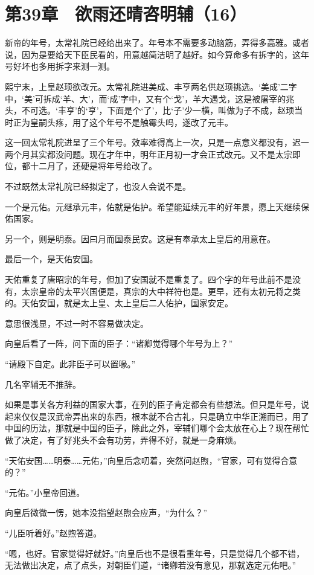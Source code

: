 \section{第39章　欲雨还晴咨明辅（16）}

新帝的年号，太常礼院已经给出来了。年号本不需要多动脑筋，弄得多高雅。或者说，因为是要给天下臣民看的，用意越简洁明了越好。如今算命多有拆字的，这年号好坏也多用拆字来测一测。

熙宁末，上皇赵顼欲改元。太常礼院进美成、丰亨两名供赵顼挑选。‘美成’二字中，‘美’可拆成‘羊、大’，而‘成’字中，又有个‘戈’，羊大遇戈，这是被屠宰的兆头，不可选。‘丰亨’的‘亨’，下面是个‘了’，比‘子’少一横，叫做为子不成，赵顼当时正为皇嗣头疼，用了这个年号不是触霉头吗，遂改了元丰。

这一回太常礼院进呈了三个年号。效率难得高上一次，只是一点意义都没有，迟一两个月其实都没问题。现在才年中，明年正月初一才会正式改元。又不是太宗即位，都十二月了，还硬是将年号给改了。

不过既然太常礼院已经拟定了，也没人会说不是。

一个是元佑。元继承元丰，佑就是佑护。希望能延续元丰的好年景，愿上天继续保佑国家。

另一个，则是明泰。因曰月而国泰民安。这是有奉承太上皇后的用意在。

最后一个，是天佑安国。

天佑重复了唐昭宗的年号，但加了安国就不是重复了。四个字的年号此前不是没有，太宗皇帝的太平兴国便是，真宗的大中祥符也是。更早，还有太初元将之类的。天佑安国，就是太上皇、太上皇后二人佑护，国家安定。

意思很浅显，不过一时不容易做决定。

向皇后看了一阵，问下面的臣子：“诸卿觉得哪个年号为上？”

“请殿下自定。此非臣子可以置喙。”

几名宰辅无不推辞。

如果是事关各方利益的国家大事，在列的臣子肯定都会有些想法。但只是年号，说起来仅仅是汉武帝弄出来的东西，根本就不合古礼，只是确立中华正溯而已，用了中国的历法，那就是中国的臣子，除此之外，宰辅们哪个会太放在心上？现在帮忙做了决定，有了好兆头不会有功劳，弄得不好，就是一身麻烦。

“天佑安国……明泰……元佑，”向皇后念叨着，突然问赵煦，“官家，可有觉得合意的？”

“元佑。”小皇帝回道。

向皇后微微一愣，她本没指望赵煦会应声，“为什么？”

“儿臣听着好。”赵煦答道。

“嗯，也好。官家觉得好就好。”向皇后也不是很看重年号，只是觉得几个都不错，无法做出决定，点了点头，对朝臣们道，“诸卿若没有意见，那就选定元佑吧。”

